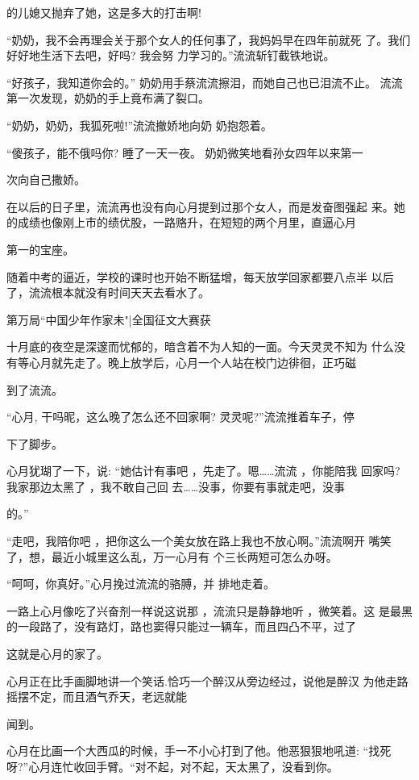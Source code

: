 \documentclass{article}
\begin{document}
的儿媳又抛弃了她，这是多大的打击啊! 

\newpage

“奶奶，我不会再理会关于那个女人的任何事了，我妈妈早在四年前就死
了。我们好好地生活下去吧，好吗? 我会努
力学习的。”流流斩钉截铁地说。 

“好孩子，我知道你会的。” 奶奶用手蔡流流擦泪，而她自己也已泪流不止。
流流第一次发现，奶奶的手上竟布满了裂口。

“奶奶，奶奶，我狐死啦!”流流撤娇地向奶
奶抱怨着。 

“傻孩子，能不俄吗你? 睡了一天一夜。 奶奶微笑地看孙女四年以来第一

次向自己撒娇。 

在以后的日子里，流流再也没有向心月提到过那个女人，而是发奋图强起
来。她的成绩也像刚上市的绩优股，一路赂升，在短短的两个月里，直逼心月

\newpage

第一的宝座。 

随着中考的逼近，学校的课时也开始不断猛增，每天放学回家都要八点半
以后了，流流根本就没有时间天天去看水了。


第万局“中国少年作家未"|全国征文大赛获

十月底的夜空是深邃而忧郁的，暗含着不为人知的一面。今天灵灵不知为
什么没有等心月就先走了。晚上放学后，心月一个人站在校门边徘徊，正巧磁

到了流流。 

“心月, 干吗昵，这么晚了怎么还不回家啊? 灵灵呢?”流流推着车子，停

下了脚步。 

心月犹瑚了一下，说: “她估计有事吧 ，先走了。嗯……流流 ，你能陪我
回家吗? 我家那边太黑了 ，我不敢自己回
\newpage
去……没事，你要有事就走吧，没事

的。” 

“走吧，我陪你吧 ，把你这么一个美女放在路上我也不放心啊。”流流啊开
嘴笑了，想，最近小城里这么乱，万一心月有
个三长两短可怎么办呀。 

“呵呵，你真好。”心月挽过流流的骆膊，并
排地走着。 

一路上心月像吃了兴奋剂一样说这说那 ，流流只是静静地听 ，微笑着。这
是最黑的一段路了，没有路灯，路也窦得只能过一辆车，而且四凸不平，过了

这就是心月的家了。 

心月正在比手画脚地讲一个笑话.恰巧一个醉汉从旁边经过，说他是醉汉
为他走路摇摆不定，而且酒气乔天，老远就能

\newpage
闻到。 

心月在比画一个大西瓜的时候，手一不小心打到了他。他恶狠狠地吼道:
“找死呀?”心月连忙收回手臂。“对不起，对不起，天太黑了，没看到你。
\end{document}
